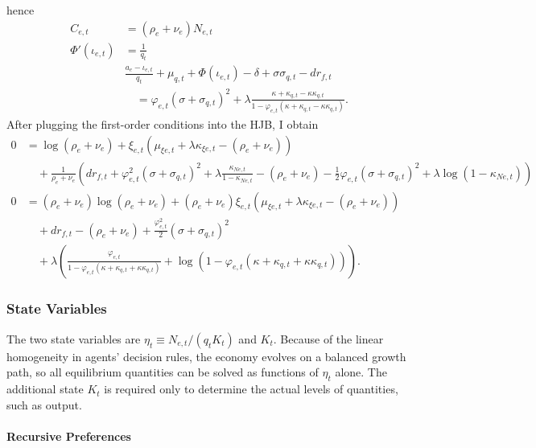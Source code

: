 \documentclass[12 pt, oneside]{article}
\theoremstyle{definition}
\theoremstyle{definition}
\theoremstyle{definition}
\begin{document}
hence
\begin{align}
\label{eq:consumption FOC log}
C_{e, t} & = (\rho_e + \nu_e)N_{e, t}\\
\label{eq:internal investment FOC log}
\Phi'(\iota_{e, t}) & = \frac{1}{q_t}\\
\label{eq:leverage FOC log}
  & \frac{a_e - \iota_{e, t}}{q_t} + \mu_{q, t} + \Phi(\iota_{e, t}) - \delta + \sigma\sigma_{q, t} - dr_{f, t}      \\
         &\quad = \varphi_{e, t}(\sigma + \sigma_{q, t})^2 + \lambda\frac{\kappa + \kappa_{q, t} - \kappa\kappa_{q, t}}{1 - \varphi_{e, t}(\kappa + \kappa_{q, t} - \kappa\kappa_{q, t})}.
\end{align}
After plugging the first-order conditions into the HJB, I obtain
\begin{align*}
  0 & = \log\left(\rho_e + \nu_e\right)  + \xi_{e, t}(\mu_{\xi e, t} + \lambda \kappa_{\xi e, t} - (\rho_e + \nu_e)) \\
    &\quad+ \frac{1}{\rho_e + \nu_e}\left(dr_{f, t} + \varphi_{e, t}^2(\sigma + \sigma_{q, t})^2 + \lambda\frac{\kappa_{Ne, t}}{1 - \kappa_{Ne, t}}  - (\rho_e + \nu_e) - \frac{1}{2}\varphi_{e, t}(\sigma + \sigma_{q, t})^2 + \lambda\log(1 - \kappa_{Ne, t}) \right)\\
  0 & = (\rho_e + \nu_e)\log\left(\rho_e + \nu_e\right)  + (\rho_e + \nu_e)\xi_{e, t}(\mu_{\xi e, t} + \lambda \kappa_{\xi e, t} - (\rho_e + \nu_e)) \\
    &\quad + dr_{f, t}  - (\rho_e + \nu_e) + \frac{\varphi_{e, t}^2}{2}(\sigma + \sigma_{q, t})^2\\
    &\quad + \lambda\left(\frac{\varphi_{e, t}}{1 - \varphi_{e, t}(\kappa + \kappa_{q, t} + \kappa\kappa_{q, t})} + \log(1 - \varphi_{e, t} (\kappa + \kappa_{q, t} + \kappa \kappa_{q, t}))\right).
\end{align*}

\subsubsection{State Variables}
The two state variables are $\eta_t\equiv N_{e, t} / (q_t K_t)$ and $K_t$. Because of the linear homogeneity in agents' decision rules, the economy evolves on a balanced growth path, so all equilibrium quantities can be solved as functions of $\eta_t$ alone. The additional state $K_t$ is required only to determine the actual levels of quantities, such as output.

\paragraph{Recursive Preferences}
\end{document}
